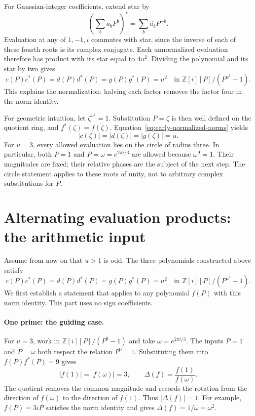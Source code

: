 \documentclass[11pt]{article}
\begin{document}
For Gaussian-integer coefficients, extend star by
\[
  {\left(\sum_{b} a_{b}P^{b}\right)}^{*}
  =\sum_{b}\overline{a_{b}}P^{-b}.
\]
Evaluation at any of $1,-1,i$ commutes with star, since the inverse of
each of these fourth roots is its complex conjugate. Each unnormalized
evaluation therefore has product with its star equal to $4u^{2}$.
Dividing the polynomial and its star by two gives
\begin{equation}
  c(P)c^{*}(P)=d(P)d^{*}(P)=g(P)g^{*}(P)=u^{2}
  \quad\text{in }\mathbb Z[i][P]/(P^{u^{2}}-1).%
  \label{eq:early-normalized-norms}
\end{equation}
This explains the normalization: halving each factor removes the factor
four in the norm identity.

For geometric intuition, let $\zeta^{u^{2}}=1$. Substitution $P=\zeta$ is
then well defined on the quotient ring, and $f^{*}(\zeta)=\overline{f(\zeta)}$.
Equation~\eqref{eq:early-normalized-norms} yields
\[
  |c(\zeta)|=|d(\zeta)|=|g(\zeta)|=u.
\]
For $u=3$, every allowed evaluation lies on the circle of radius three.
In particular, both $P=1$ and $P=\omega=e^{2\pi i/3}$ are allowed because
$\omega^{9}=1$. Their magnitudes are fixed; their relative phases are the
subject of the next step. The circle statement applies to these roots
of unity, not to arbitrary complex substitutions for $P$.
\section{Alternating evaluation products: the arithmetic input}%
\label{sec:late-delta}

Assume from now on that $u>1$ is odd. The three polynomials constructed
above satisfy
\[
 c(P)c^{*}(P)=d(P)d^{*}(P)=g(P)g^{*}(P)=u^{2}
 \quad\text{in }\mathbb Z[i][P]/(P^{u^{2}}-1).
\]
We first establish a statement that applies to any polynomial $f(P)$
with this norm identity. This part uses no sign coefficients.

\paragraph{One prime: the guiding case.}
For $u=3$, work in $\mathbb Z[i][P]/(P^9-1)$ and take
$\omega=e^{2\pi i/3}$. The inputs $P=1$ and $P=\omega$ both respect
the relation $P^9=1$. Substituting them into $f(P)f^*(P)=9$ gives
\[
 |f(1)|=|f(\omega)|=3,
 \qquad \Delta(f)=\frac{f(1)}{f(\omega)}.
\]
The quotient removes the common magnitude and records the rotation from
the direction of $f(\omega)$ to the direction of $f(1)$. Thus
$|\Delta(f)|=1$. For example, $f(P)=3iP$ satisfies the norm identity
and gives $\Delta(f)=1/\omega=\omega^2$.
\end{document}
